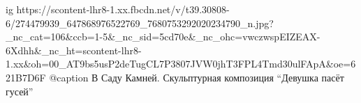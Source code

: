  
 
 
 
 

\ifcmt
  ig https://scontent-lhr8-1.xx.fbcdn.net/v/t39.30808-6/274479939_647868976522769_7680753292020234790_n.jpg?_nc_cat=106&ccb=1-5&_nc_sid=5cd70e&_nc_ohc=vwczwspEIZEAX-6Xdhh&_nc_ht=scontent-lhr8-1.xx&oh=00_AT9bs5usP2deTugCL7P3807JVW0jhT3FPL4Tmd30ulFApA&oe=621B7D6F
  @caption В Саду Камней. Скульптурная композиция \enquote{Девушка пасёт гусей}
\fi
